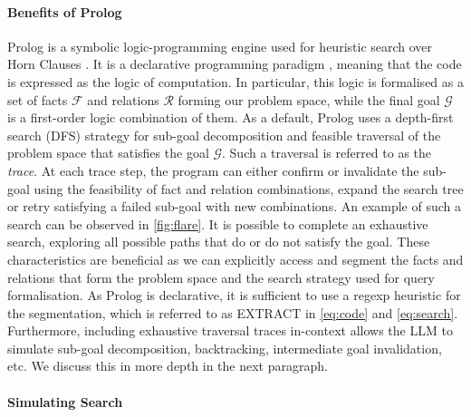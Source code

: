 \documentclass{article} %
\begin{document}
\paragraph{Benefits of Prolog}

Prolog is a symbolic logic-programming engine \citep{DBLP:conf/acm/Bowen79} used for heuristic search over Horn Clauses \citep{DBLP:journals/jlp/ChandraH85}. It is a declarative programming paradigm \citep{DBLP:conf/agp/Lloyd94}, meaning that the code is expressed as the logic of computation. In particular, this logic is formalised as a set of facts $\mathcal{F}$ and relations $\mathcal{R}$ forming our problem space, while the final goal $\mathcal{G}$ is a first-order logic combination of them. As a default, Prolog uses a depth-first search (DFS) strategy \citep{DBLP:conf/acm/Bowen79} for sub-goal decomposition and feasible traversal of the problem space that satisfies the goal $\mathcal{G}$. Such a traversal is referred to as the \emph{trace}. At each trace step, the program can either confirm or invalidate the sub-goal using the feasibility of fact and relation combinations, expand the search tree or retry satisfying a failed sub-goal with new combinations. An example of such a search can be observed in \cref{fig:flare}.
%
It is possible to complete an exhaustive search, exploring all possible paths that do or do not satisfy the goal. 
%
These characteristics are beneficial as we can explicitly access and segment the facts and relations that form the problem space and the search strategy used for query formalisation. As Prolog is declarative, it is sufficient to use a regexp heuristic for the segmentation, which is referred to as EXTRACT in \cref{eq:code} and \cref{eq:search}.
%
Furthermore, including exhaustive traversal traces in-context allows the LLM to simulate sub-goal decomposition, backtracking, intermediate goal invalidation, etc. We discuss this in more depth in the next paragraph.

\paragraph{Simulating Search}
\end{document}
